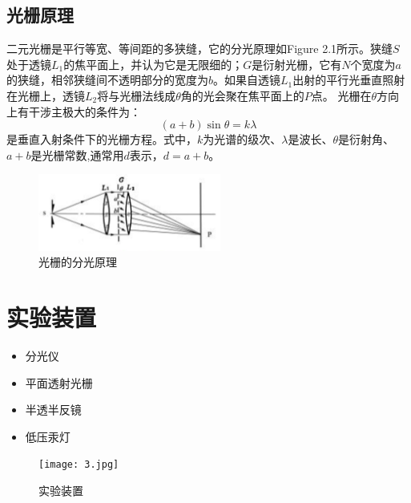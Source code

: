 \documentclass{article}
\begin{document}
\subsection{光栅原理}
\hspace*{2em}二元光栅是平行等宽、等间距的多狭缝，它的分光原理如Figure 2.1所示。狭缝\(S\)处于透镜\(L_{1}\)的焦平面上，并认为它是无限细的；\(G\)是衍射光栅，它有\(N\)个宽度为\(a\)的狭缝，相邻狭缝间不透明部分的宽度为\(b\)。如果自透镜\(L_{1}\)出射的平行光垂直照射在光栅上，透镜\(L_{2}\)将与光栅法线成\(\theta\)角的光会聚在焦平面上的\(P\)点。
光栅在\(\theta\)方向上有干涉主极大的条件为：
\begin{equation}
(a + b)\sin\theta = k\lambda
\end{equation}
是垂直入射条件下的光栅方程。式中，\(k\)为光谱的级次、\(\lambda\)是波长、\(\theta\)是衍射角、\(a+b\)是光栅常数,通常用\(d\)表示，\(d = a + b\)。
\begin{figure}[h]
    \centering
    \includegraphics[width=6cm]{2.1.png} %
    \caption{光栅的分光原理}
\end{figure}
\section{实验装置}
\begin{itemize}
    \item 分光仪
    \item 平面透射光栅
    \item 半透半反镜
    \item 低压汞灯
\end{itemize}
\begin{figure}[ht]
    \centering
    \texttt{[image: 3.jpg]}
    \caption{实验装置}
\end{figure}
\end{document}
